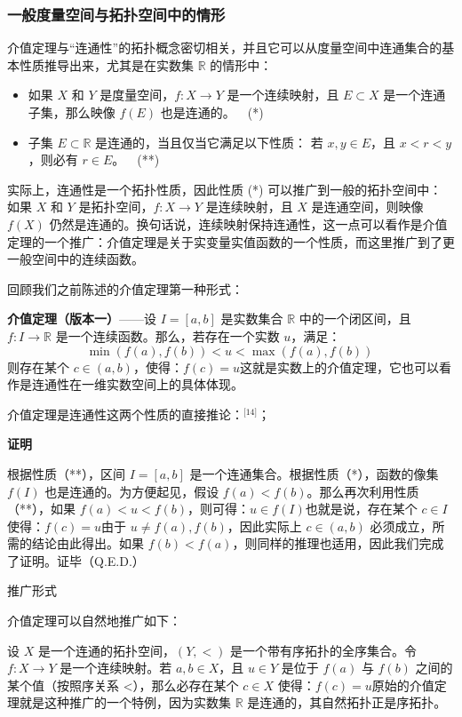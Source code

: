 \subsubsection{一般度量空间与拓扑空间中的情形}
介值定理与“连通性”的拓扑概念密切相关，并且它可以从度量空间中连通集合的基本性质推导出来，尤其是在实数集 $\mathbb{R}$ 的情形中：
\begin{itemize}
\item 如果 $X$ 和 $Y$ 是度量空间，$f: X \to Y$ 是一个连续映射，且 $E \subset X$ 是一个连通子集，那么映像 $f(E)$ 也是连通的。 (*)
\item 子集 $E \subset \mathbb{R}$ 是连通的，当且仅当它满足以下性质：
  若 $x, y \in E$，且 $x < r < y$，则必有 $r \in E$。 (**)
\end{itemize}
实际上，连通性是一个拓扑性质，因此性质 (*) 可以推广到一般的拓扑空间中：
如果 $X$ 和 $Y$ 是拓扑空间，$f: X \to Y$ 是连续映射，且 $X$ 是连通空间，则映像 $f(X)$ 仍然是连通的。换句话说，连续映射保持连通性，这一点可以看作是介值定理的一个推广：介值定理是关于实变量实值函数的一个性质，而这里推广到了更一般空间中的连续函数。

回顾我们之前陈述的介值定理第一种形式：

\textbf{介值定理（版本一）}——设 $I = [a, b]$ 是实数集合 $\mathbb{R}$ 中的一个闭区间，且 $f: I \to \mathbb{R}$ 是一个连续函数。那么，若存在一个实数 $u$，满足：
$$
\min(f(a), f(b)) < u < \max(f(a), f(b))~
$$
则存在某个 $c \in (a, b)$，使得：$f(c) = u$这就是实数上的介值定理，它也可以看作是连通性在一维实数空间上的具体体现。

介值定理是连通性这两个性质的直接推论：\(^\text{[14]}\)；

\textbf{证明}

根据性质（**），区间 $I = [a, b]$ 是一个连通集合。根据性质（*），函数的像集 $f(I)$ 也是连通的。为方便起见，假设 $f(a) < f(b)$。那么再次利用性质（**），如果 $f(a) < u < f(b)$，则可得：$u \in f(I)$也就是说，存在某个 $c \in I$ 使得：$f(c) = u$由于 $u \ne f(a), f(b)$，因此实际上 $c \in (a, b)$ 必须成立，所需的结论由此得出。如果 $f(b) < f(a)$，则同样的推理也适用，因此我们完成了证明。证毕（Q.E.D.）

推广形式

介值定理可以自然地推广如下：

设 $X$ 是一个连通的拓扑空间，$(Y, <)$ 是一个带有序拓扑的全序集合。令 $f: X \to Y$ 是一个连续映射。若 $a, b \in X$，且 $u \in Y$ 是位于 $f(a)$ 与 $f(b)$ 之间的某个值（按照序关系 <），那么必存在某个 $c \in X$ 使得：$f(c) = u$原始的介值定理就是这种推广的一个特例，因为实数集 $\mathbb{R}$ 是连通的，其自然拓扑正是序拓扑。

